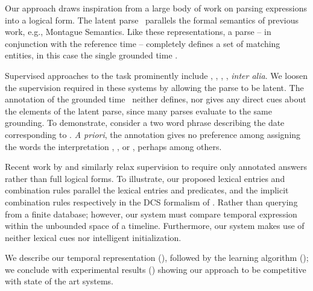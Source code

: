 Our approach draws inspiration from a large body of work
	on parsing expressions into a logical form.
The latent parse \latent\ parallels the formal semantics of previous work,
	e.g., Montague Semantics.
Like these representations, a parse -- in conjunction with
	the reference time -- completely defines a set of
	matching entities, in this case the single grounded time \grounded.

Supervised approaches to the task prominently include
	,
	,
	, 
	, 
	\textit{inter alia}.
We loosen the supervision required in these systems by allowing the parse to
	be latent.
The annotation of the grounded time \grounded\ neither defines, nor gives any
	direct cues about the elements of the latent parse, since many parses evaluate
	to the same grounding.
To demonstrate, consider a two word phrase describing the date corresponding to
	.
\textit{A priori}, the annotation gives no preference among assigning the
	words the interpretation , ,
	or \te{[month] [day]}, perhaps among others.

Recent work by  and 
	 similarly relax supervision 
	to require only annotated answers rather than full logical forms.
To illustrate, our proposed lexical entries and combination rules parallel
	the lexical entries and predicates, and the implicit combination rules
	respectively in the DCS formalism of .
Rather than querying from a finite database; however, our system must compare
	temporal expression within the unbounded space of a timeline.
Furthermore, our system makes use of neither lexical cues nor intelligent
	initialization.

We describe our temporal representation
	(), followed by the learning algorithm
	(); we conclude with experimental results 
	() showing our
	approach to be competitive with state of the art systems.
